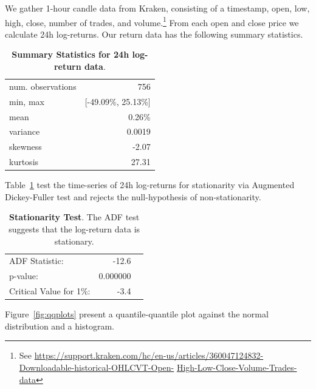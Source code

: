 \documentclass[english,11pt]{article}
\begin{document}
We gather 1-hour candle data from Kraken, consisting of a timestamp, open, low,
high, close, number of trades, and volume.\footnote{See \url{https://support.kraken.com/hc/en-us/articles/360047124832-Downloadable-historical-OHLCVT-Open-} \url{High-Low-Close-Volume-Trades-data}}
From each open and close price we calculate 24h log-returns. Our return data has the following summary statistics.
\begin{table}[!h]
\caption{\textbf{Summary Statistics for 24h log-return data}.}
\centering
\begin{tabular}{lr}
\hline
num. observations & 756\\
min, max &[-49.09\%, 25.13\%] \\
mean & 0.26\% \\
variance & 0.0019 \\ 
skewness & -2.07 \\
kurtosis & 27.31 \\
\hline
\end{tabular}
\end{table}
Table~\ref{tab:adf} test the time-series of 24h log-returns for stationarity via Augmented Dickey-Fuller test and rejects the null-hypothesis
of non-stationarity.
\begin{table}[!h]
\caption{\textbf{Stationarity Test}. The ADF test suggests that the log-return data is stationary.\label{tab:adf}}
\centering
\begin{tabular}{lrr}
\hline
ADF Statistic: &-12.6\\
p-value: &0.000000\\
Critical Value for 1\%:& -3.4\\
\hline
\end{tabular}
\end{table}

Figure~\ref{fig:qqplots} present a quantile-quantile plot against the normal distribution
and a histogram.
\end{document}
